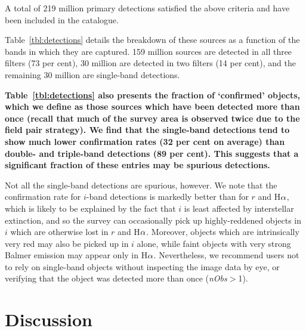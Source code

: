 \documentclass[a4paper,useAMS,usenatbib]{mn2e}
\def\ha{\mbox{H$\rm \alpha$}}
\begin{document}
A total of 219 million primary detections satisfied
the above criteria and have been included in the catalogue.

Table~\ref{tbl:detections} details the breakdown of these
sources as a function of the bands in which they are captured.
159 million sources are detected in all three filters (73 per cent),
30 million are detected in two filters (14 per cent),
and the remaining 30 million are single-band detections.
{\bf
Table~\ref{tbl:detections} also presents 
the fraction of `confirmed' objects,
which we define as those sources
which have been detected more than once
(recall that much of the survey area
is observed twice due to the field pair strategy).
We find that the single-band detections tend
to show much lower confirmation rates (32 per cent on average)
than double- and triple-band detections (89 per cent).
This suggests that a significant fraction of
these entries may be spurious detections.

Not all the single-band detections are spurious, however.
We note that the confirmation rate for $i$-band detections
is markedly better than for $r$ and \ha,
which is likely to be explained by the fact that $i$ is least
affected by interstellar extinction, and so the survey can occasionally pick up
highly-reddened objects in $i$ which are otherwise lost in $r$ and \ha.
Moreover, objects which are intrinsically very red may also be picked
up in $i$ alone, while faint objects with very strong Balmer emission
may appear only in \ha.
Nevertheless, we recommend users not to rely on single-band objects
without inspecting the image data by eye,
or verifying that the object
was detected more than once (\emph{nObs}$>$1).
}

\section{Discussion}
\label{sec:discussion}
\end{document}
